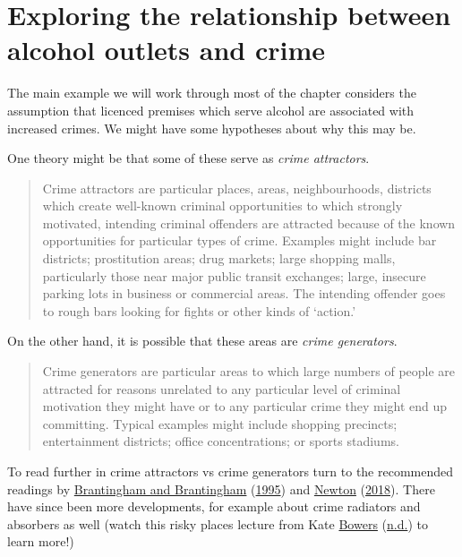 \documentclass[
]{book}
\begin{document}
\hypertarget{exploring-the-relationship-between-alcohol-outlets-and-crime}{%
\section{Exploring the relationship between alcohol outlets and crime}\label{exploring-the-relationship-between-alcohol-outlets-and-crime}}

The main example we will work through most of the chapter considers the assumption that licenced premises which serve alcohol are associated with increased crimes. We might have some hypotheses about why this may be.

One theory might be that some of these serve as \emph{crime attractors}.

\begin{quote}
Crime attractors are particular places, areas, neighbourhoods, districts which create well-known criminal opportunities to which strongly motivated, intending criminal offenders are attracted because of the known opportunities for particular types of crime. Examples might include bar districts; prostitution areas; drug markets; large shopping malls, particularly those near major public transit exchanges; large, insecure parking lots in business or commercial areas. The intending offender goes to rough bars looking for fights or other kinds of `action.'
\end{quote}

On the other hand, it is possible that these areas are \emph{crime generators}.

\begin{quote}
Crime generators are particular areas to which large numbers of people are attracted for reasons unrelated to any particular level of criminal motivation they might have or to any particular crime they might end up committing. Typical examples might include shopping precincts; entertainment districts; office concentrations; or sports stadiums.
\end{quote}

To read further in crime attractors vs crime generators turn to the recommended readings by \protect\hyperlink{ref-Brantingham_1995}{Brantingham and Brantingham} (\protect\hyperlink{ref-Brantingham_1995}{1995}) and \protect\hyperlink{ref-Newton_2018}{Newton} (\protect\hyperlink{ref-Newton_2018}{2018}). There have since been more developments, for example about crime radiators and absorbers as well (watch this risky places lecture from Kate \protect\hyperlink{ref-Bowers_2021}{Bowers} (\protect\hyperlink{ref-Bowers_2021}{n.d.}) to learn more!)
\end{document}
